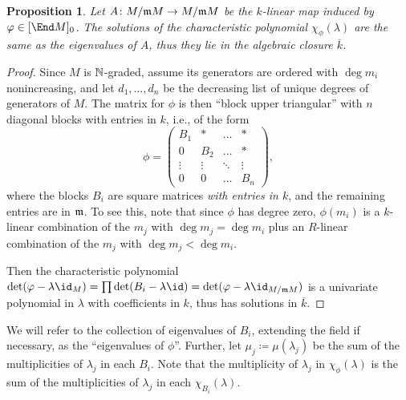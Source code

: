 \documentclass[12pt]{article}
\let\bar\overline
\theoremstyle{theorem}
\numberwithin{thm}{section}
\newtheorem{prop}[thm]{Proposition}
\theoremstyle{definition}
\begin{document}
\begin{prop}\label{prop:eigenvalues}
  Let $A\colon M/\mathfrak m M\to M/\mathfrak m M$ be the $k$-linear map induced by $\phi\in[\End M]_0$. The solutions of the characteristic polynomial $\chi_\phi(\lambda)$ are the same as the eigenvalues of $A$, thus they lie in the algebraic closure $\bar k$.
\end{prop}
\begin{proof}
  Since $M$ is $\mathbb N$-graded, assume its generators are ordered with $\deg m_i$ nonincreasing, and let $d_1,\dots,d_n$ be the decreasing list of unique degrees of generators of $M$. The matrix for $\phi$ is then ``block upper triangular'' with $n$ diagonal blocks with entries in $k$, i.e., of the form
  \begin{equation}\label{eq:blocks}
    \phi = \begin{pmatrix}
    B_1    & *      & \dots  & *      \\
    0      & B_2    & \dots  & *      \\
    \vdots & \vdots & \ddots & \vdots \\
    0      & 0      & \dots  & B_n
    \end{pmatrix},
  \end{equation}
  where the blocks $B_i$ are square matrices \emph{with entries in $k$}, and the remaining entries are in $\mathfrak m$. To see this, note that since $\phi$ has degree zero, $\phi(m_i)$ is a $k$-linear combination of the $m_j$ with $\deg m_j = \deg m_i$ plus an $R$-linear combination of the $m_j$ with $\deg m_j < \deg m_i$. %

  Then the characteristic polynomial $\det(\phi - \lambda \id_M) = \prod \det(B_i - \lambda \id) = \det(\phi - \lambda \id_{M/\m M})$ is a univariate polynomial in $\lambda$ with coefficients in $k$, thus has solutions in $\bar k$.
\end{proof}

We will refer to the collection of eigenvalues of $B_i$, extending the field if necessary, as the ``eigenvalues of $\phi$''. Further, let $\mu_j \coloneqq \mu(\lambda_j)$ be the sum of the multiplicities of $\lambda_j$ in each $B_i$. Note that the multiplicity of $\lambda_j$ in $\chi_\phi(\lambda)$ is the sum of the multiplicities of $\lambda_j$ in each $\chi_{B_i}(\lambda)$.
\end{document}
